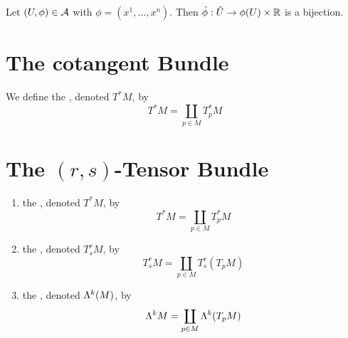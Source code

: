 \documentclass{book}
\begin{document}
	\begin{ex}
		Let $(U, \phi) \in \mathcal{A}$ with $\phi = (x^1, \dots, x^n)$. Then $\tilde{\phi}:\tilde{U} \rightarrow \phi(U) \times \mathbb{R}$ is a bijection. 
	\end{ex}





























	\newpage
	\section{The cotangent Bundle}
	
	\begin{defn}
		We define the , denoted $T^*M$, by 
		$$T^*M = \coprod_{p \in M} T_p^*M$$ 
	\end{defn}













	
	
	
	
	
	
	
	
	
	
	\section{The $(r,s)$-Tensor Bundle}
	
	\begin{defn}
	\begin{enumerate}
		\item the , denoted $T^*M$, by 
		$$T^*M = \coprod_{p \in M} T_p^*M$$
		\item the , denoted $T^r_sM$, by
	$$T^r_s M = \coprod_{p \in M} T^r_s(T_p M)$$
	\item the , denoted $\Lambda^k(M)$, by
	$$\Lambda^kM = \coprod_{p \in M} \Lambda^k(T_pM)$$
		\end{enumerate}
	\end{defn}
	
\end{document}
